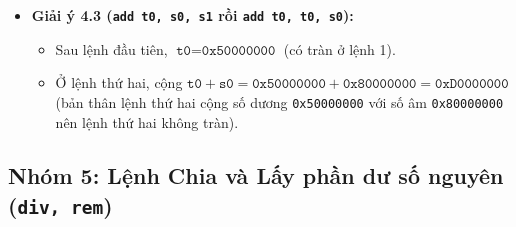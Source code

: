 \begin{itemize}
\begin{itemize}
    \end{itemize}
    \item \textbf{Giải ý 4.3 (\texttt{add t0, s0, s1} rồi \texttt{add t0, t0, s0}):}
    \begin{itemize}
        \item Sau lệnh đầu tiên, $\texttt{t0} = \texttt{0x50000000}$ (có tràn ở lệnh 1).
        \item Ở lệnh thứ hai, cộng $\texttt{t0} + \texttt{s0} = \texttt{0x50000000} + \texttt{0x80000000} = \mathbf{\texttt{0xD0000000}}$ (bản thân lệnh thứ hai cộng số dương \texttt{0x50000000} với số âm \texttt{0x80000000} nên lệnh thứ hai không tràn).
    \end{itemize}
\end{itemize}

\subsection{Nhóm 5: Lệnh Chia và Lấy phần dư số nguyên (\texttt{div, rem})}

